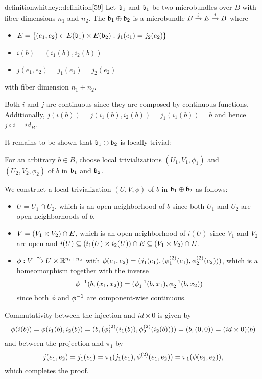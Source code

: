 \begin{mystatement}{definition}{whitney::definition}[59]
    Let $\bb_1$ and $\bb_1$ be two microbundles over $B$ with fiber dimensions $n_1$ and $n_2$.
    The  $\whitney{\bb_1}{\bb_2}$ is a microbundle $\bundle{B}{E}{i}{j}$ where
    \begin{itemize}
        \item $E = \set{ (e_1, e_2) \in E(\bb_1) \cross E(\bb_2)}{j_1(e_1) = j_2(e_2)}$
        \item $i(b) = (i_1(b), i_2(b))$
        \item $j(e_1, e_2) = j_1(e_1) = j_2(e_2)$
    \end{itemize}
    with fiber dimension $n_1 + n_2$.
\end{mystatement}

\begin{myproof}
    Both $i$ and $j$ are continuous
    since they are composed by continuous functions.
    Additionally, $j(i(b)) = j(i_1(b), i_2(b)) = j_1(i_1(b)) = b$ and hence $j \circ i = id_B$.

    It remains to be shown that $\whitney{\bb_1}{\bb_2}$ is locally trivial:

    For an arbitrary $b \in B$,
    choose local trivializations
    $(U_1, V_1, \phi_1)$ and $(U_2, V_2, \phi_2)$ of $b$ in $\bb_1$ and $\bb_2$.
    
    We construct a local trivialization $(U, V, \phi)$ of $b$ in $\whitney{\bb_1}{\bb_2}$ as follows:
    \begin{itemize}
        \item $U = U_1 \cap U_2$, which is an open neighborhood of $b$
        since both $U_1$ and $U_2$ are open neighborhoods of $b$.
        \item $V = (V_1 \cross V_2) \cap E$, which is an open neighborhood of $i(U)$ 
        since $V_1$ and $V_2$ are open and
        $i(U) \sub (i_1(U) \times i_2(U)) \cap E \sub (V_1 \cross V_2) \cap E$.
        \item $\phi: V \isomto U \cross \R^{n_1 + n_2}$ with
        $\phi(e_1, e_2) = (j_1(e_1), (\snd{\phi_1}(e_1),  \snd{\phi_2}(e_2)))$,
        which is a homeomorphism together with the inverse
        \[ \inv{\phi}(b, (x_1, x_2)) = (\inv{\phi_1}(b, x_1), \inv{\phi_2}(b, x_2)) \]
        since both $\phi$ and $\inv{\phi}$ are component-wise continuous.
    \end{itemize}
    
    Commutativity between the injection and $id \times 0$ is given by
    \[ \phi(i(b)) = \phi(i_1(b), i_2(b)) = (b, (\snd{\phi_1}(i_1(b)), \snd{\phi_2}(i_2(b)))) = (b, (0, 0)) = (id \cross 0)(b) \]
    and between the projection and $\pi_1$ by
    \[ j(e_1, e_2) = j_1(e_1) = \pi_1(j_1(e_1), \snd{\phi}(e_1, e_2)) = \pi_1(\phi(e_1, e_2)), \]
    which completes the proof. 
\end{myproof}

